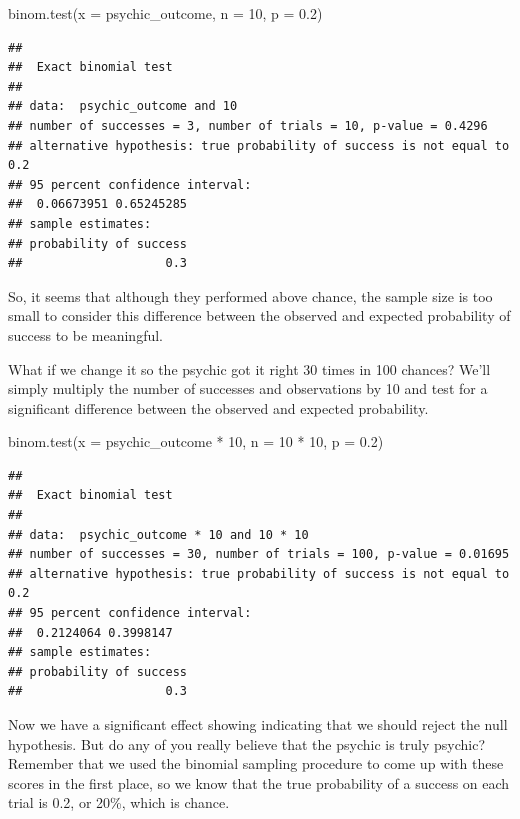 \documentclass[
]{book}
\newenvironment{Shaded}{\begin{snugshade}}{\end{snugshade}}
\newcommand{\AttributeTok}[1]{\textcolor[rgb]{0.77,0.63,0.00}{#1}}
\newcommand{\DecValTok}[1]{\textcolor[rgb]{0.00,0.00,0.81}{#1}}
\newcommand{\FloatTok}[1]{\textcolor[rgb]{0.00,0.00,0.81}{#1}}
\newcommand{\FunctionTok}[1]{\textcolor[rgb]{0.00,0.00,0.00}{#1}}
\newcommand{\NormalTok}[1]{#1}
\newcommand{\SpecialCharTok}[1]{\textcolor[rgb]{0.00,0.00,0.00}{#1}}
\begin{document}
\begin{Shaded}
\begin{Highlighting}[]
\FunctionTok{binom.test}\NormalTok{(}\AttributeTok{x =}\NormalTok{ psychic\_outcome, }\AttributeTok{n =} \DecValTok{10}\NormalTok{, }\AttributeTok{p =} \FloatTok{0.2}\NormalTok{)}
\end{Highlighting}
\end{Shaded}

\begin{verbatim}
## 
##  Exact binomial test
## 
## data:  psychic_outcome and 10
## number of successes = 3, number of trials = 10, p-value = 0.4296
## alternative hypothesis: true probability of success is not equal to 0.2
## 95 percent confidence interval:
##  0.06673951 0.65245285
## sample estimates:
## probability of success 
##                    0.3
\end{verbatim}

So, it seems that although they performed above chance, the sample size is too small to consider this difference between the observed and expected probability of success to be meaningful.

What if we change it so the psychic got it right 30 times in 100 chances? We'll simply multiply the number of successes and observations by 10 and test for a significant difference between the observed and expected probability.

\begin{Shaded}
\begin{Highlighting}[]
\FunctionTok{binom.test}\NormalTok{(}\AttributeTok{x =}\NormalTok{ psychic\_outcome }\SpecialCharTok{*} \DecValTok{10}\NormalTok{, }\AttributeTok{n =} \DecValTok{10} \SpecialCharTok{*} \DecValTok{10}\NormalTok{, }\AttributeTok{p =} \FloatTok{0.2}\NormalTok{)}
\end{Highlighting}
\end{Shaded}

\begin{verbatim}
## 
##  Exact binomial test
## 
## data:  psychic_outcome * 10 and 10 * 10
## number of successes = 30, number of trials = 100, p-value = 0.01695
## alternative hypothesis: true probability of success is not equal to 0.2
## 95 percent confidence interval:
##  0.2124064 0.3998147
## sample estimates:
## probability of success 
##                    0.3
\end{verbatim}

Now we have a significant effect showing indicating that we should reject the null hypothesis. But do any of you really believe that the psychic is truly psychic? Remember that we used the binomial sampling procedure to come up with these scores in the first place, so we know that the true probability of a success on each trial is 0.2, or 20\%, which is chance.
\end{document}
